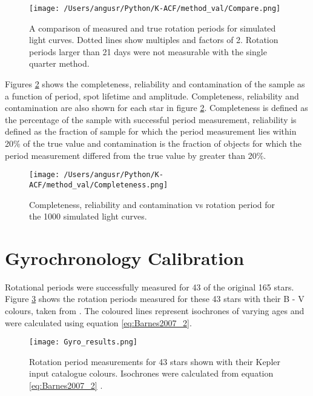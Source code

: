 \documentclass[12pt,preprint]{aastex}
\begin{document}
\begin{figure}[ht]
\begin{center}
\texttt{[image: /Users/angusr/Python/K-ACF/method\_val/Compare.png]}
\caption{A comparison of measured and true rotation periods for simulated light curves. Dotted lines show multiples and factors of 2. Rotation periods larger than 21 days were not measurable with the single quarter method. }
\label{fig:compare}
\end{center}
\end{figure}

Figures \ref{fig:completeness} shows the completeness, reliability and contamination of the sample as a function of period, spot lifetime and amplitude. 
Completeness, reliability and contamination are also shown for each star in figure \ref{fig:completeness}. 
Completeness is defined as  the percentage of the sample with successful period measurement, reliability is defined as the fraction of sample for which the period measurement lies within 20\% of the true value and contamination is the fraction of objects for which the period measurement differed from the true value by greater than 20\%.

\begin{figure}[ht]
\begin{center}
\texttt{[image: /Users/angusr/Python/K-ACF/method\_val/Completeness.png]}
\caption{Completeness, reliability and contamination vs rotation period for the 1000 simulated light curves. }
\label{fig:completeness}
\end{center}
\end{figure}

\section{Gyrochronology Calibration}

Rotational periods were successfully measured for 43 of the original
165 stars. Figure \ref{fig:results} shows the rotation periods measured for these 43
stars with their B - V colours, taken from \citet{catalogue}. The
coloured lines represent isochrones of varying ages and were
calculated using equation \ref{eq:Barnes2007_2}.

\begin{figure}[ht]
\begin{center}
\texttt{[image: Gyro\_results.png]}
\caption{Rotation period measurements for 43 stars shown with their
  Kepler input catalogue colours. Isochrones were calculated from
  equation \ref{eq:Barnes2007_2} \citep{Barnes_2007}.}
\label{fig:results}
\end{center}
\end{figure}
\end{document}

